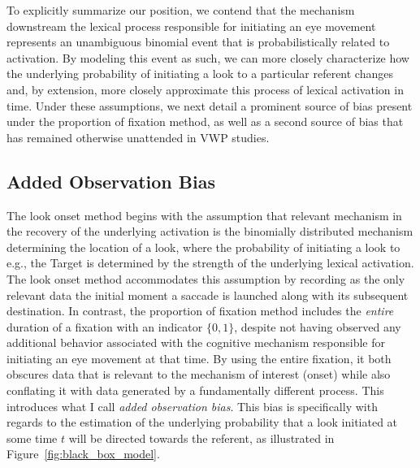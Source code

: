 \documentclass{article}
\begin{document}
To explicitly summarize our position, we contend that the mechanism downstream the lexical process responsible for initiating an eye movement represents an unambiguous binomial event that is probabilistically related to activation. By modeling this event as such, we can more closely characterize how the underlying probability of initiating a look to a particular referent changes and, by extension, more closely approximate this process of lexical activation in time. Under these assumptions, we next detail a prominent source of bias present under the proportion of fixation method, as well as a second source of bias that has remained otherwise unattended in VWP studies. 

\subsection{Added Observation Bias}

The look onset method begins with the assumption that relevant mechanism in the recovery of the underlying activation is the binomially distributed mechanism determining the location of a look, where the probability of initiating a look to e.g., the Target is determined by the strength of the underlying lexical activation. The look onset method accommodates this assumption by recording as the only relevant data the initial moment a saccade is launched along with its subsequent destination. In contrast, the proportion of fixation method includes the \textit{entire} duration of a fixation with an indicator $\{0,1\}$, despite not having observed any additional behavior associated with the cognitive mechanism responsible for initiating an eye movement at that time. By using the entire fixation, it both obscures data that is relevant to the mechanism of interest (onset) while also conflating it with data generated by a fundamentally different process. This introduces what I call \textit{added observation bias}. This bias is specifically with regards to the estimation of the underlying probability that a look initiated at some time $t$ will be directed towards the referent, as illustrated in Figure~\ref{fig:black_box_model}.
\end{document}
